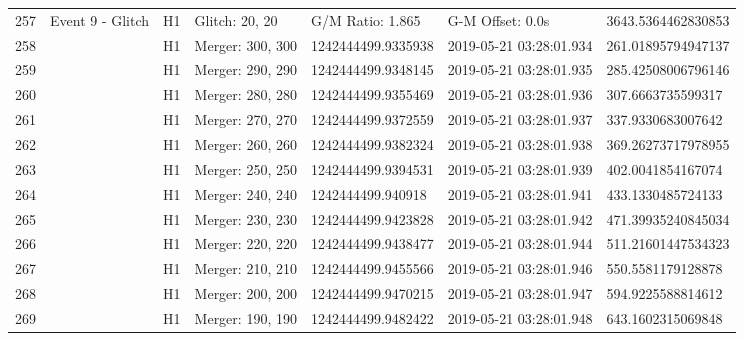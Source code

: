 \begin{longtable}{lllllll}
257  &                                   Event 9 - Glitch &       H1 &    Glitch: 20, 20 &    G/M Ratio: 1.865 &         G-M Offset: 0.0s &  3643.5364462830853 \\
258  &                                                    &       H1 &  Merger: 300, 300 &  1242444499.9335938 &  2019-05-21 03:28:01.934 &  261.01895794947137 \\
259  &                                                    &       H1 &  Merger: 290, 290 &  1242444499.9348145 &  2019-05-21 03:28:01.935 &  285.42508006796146 \\
260  &                                                    &       H1 &  Merger: 280, 280 &  1242444499.9355469 &  2019-05-21 03:28:01.936 &   307.6663735599317 \\
261  &                                                    &       H1 &  Merger: 270, 270 &  1242444499.9372559 &  2019-05-21 03:28:01.937 &   337.9330683007642 \\
262  &                                                    &       H1 &  Merger: 260, 260 &  1242444499.9382324 &  2019-05-21 03:28:01.938 &  369.26273717978955 \\
263  &                                                    &       H1 &  Merger: 250, 250 &  1242444499.9394531 &  2019-05-21 03:28:01.939 &   402.0041854167074 \\
264  &                                                    &       H1 &  Merger: 240, 240 &   1242444499.940918 &  2019-05-21 03:28:01.941 &   433.1330485724133 \\
265  &                                                    &       H1 &  Merger: 230, 230 &  1242444499.9423828 &  2019-05-21 03:28:01.942 &  471.39935240845034 \\
266  &                                                    &       H1 &  Merger: 220, 220 &  1242444499.9438477 &  2019-05-21 03:28:01.944 &  511.21601447534323 \\
267  &                                                    &       H1 &  Merger: 210, 210 &  1242444499.9455566 &  2019-05-21 03:28:01.946 &   550.5581179128878 \\
268  &                                                    &       H1 &  Merger: 200, 200 &  1242444499.9470215 &  2019-05-21 03:28:01.947 &   594.9225588814612 \\
269  &                                                    &       H1 &  Merger: 190, 190 &  1242444499.9482422 &  2019-05-21 03:28:01.948 &   643.1602315069848 \\

\end{longtable}
